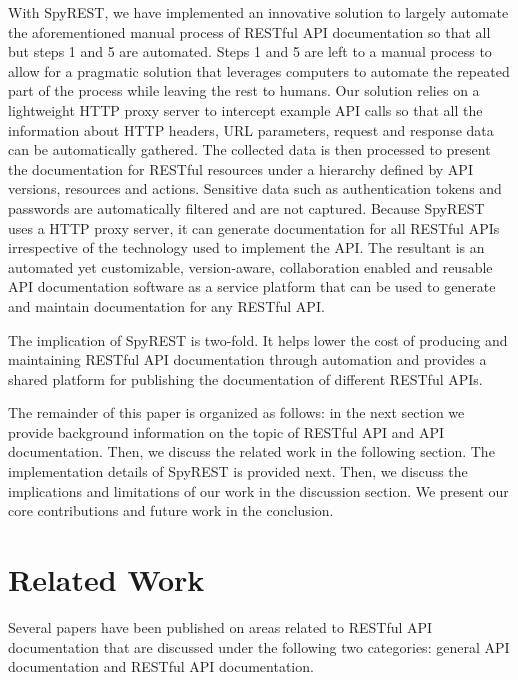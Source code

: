 \documentclass[conference]{IEEEtran}
\begin{document}
With SpyREST, we have implemented an innovative solution to largely automate the aforementioned manual process of RESTful API documentation so that all but steps 1 and 5 are automated. Steps 1 and 5 are left to a manual process to allow for a pragmatic solution that leverages computers to automate the repeated part of the process while leaving the rest to humans. Our solution relies on a lightweight HTTP proxy server to intercept example API calls so that all the information about HTTP headers, URL parameters, request and response data can be automatically gathered. The collected data is then processed to present the documentation for RESTful resources under a hierarchy defined by API versions, resources and actions. Sensitive data such as authentication tokens and passwords are automatically filtered and are not captured. Because SpyREST uses a HTTP proxy server, it can generate documentation for all RESTful APIs irrespective of the technology used to implement the API. The resultant is an automated yet customizable, version-aware, collaboration enabled and reusable API documentation software as a service platform that can be used to generate and maintain documentation for any RESTful API.

The implication of SpyREST is two-fold. It helps lower the cost of producing and maintaining RESTful API documentation through automation and provides a shared platform for publishing the documentation of different RESTful APIs.

The remainder of this paper is organized as follows: in the next section we provide background information on the topic of RESTful API and API documentation. Then, we discuss the related work in the following section. The implementation details of SpyREST is provided next. Then, we discuss the implications and limitations of our work in the discussion section. We present our core contributions and future work in the conclusion.


\section{Related Work} %
\label{sec:related_work}
Several papers have been published on areas related to RESTful API documentation that are discussed under the following two categories: general API documentation and RESTful API documentation.
\end{document}
